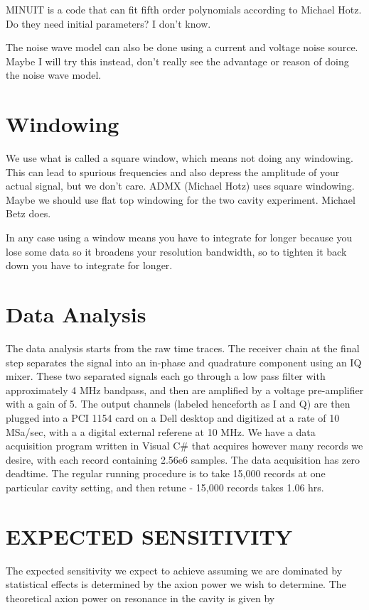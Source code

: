 \documentclass[11pt]{article}
\begin{document}
MINUIT is a code that can fit fifth order polynomials according to Michael Hotz. Do they need initial parameters? I don't know.

The noise wave model can also be done using a current and voltage noise source. Maybe I will try this instead, don't really see the advantage or reason of doing the noise wave model.


\section{Windowing}

We use what is called a square window, which means not doing any windowing. This can lead to spurious frequencies and also depress the amplitude of your actual signal, but we don't care.
ADMX (Michael Hotz) uses square windowing.
Maybe we should use flat top windowing for the two cavity experiment. Michael Betz does.

In any case using a window means you have to integrate for longer because you lose some data so it broadens your resolution bandwidth, so to tighten it back down you have to integrate for longer.

\section{Data Analysis}

The data analysis starts from the raw time traces. The receiver chain at the final step separates the signal into an in-phase and quadrature component using an IQ mixer. These two separated signals each go through a low pass filter with approximately 4 MHz bandpass, and then are amplified by a voltage pre-amplifier with a gain of 5. The output channels (labeled henceforth as I and Q) are then plugged into a PCI 1154 card on a Dell desktop and digitized at a rate of 10 MSa/sec, with a a digital external referene at 10 MHz. We have a data acquisition program written in Visual C$\#$ that acquires however many records we desire, with each record containing 2.56e6 samples. The data acquisition has zero deadtime. The regular running procedure is to take 15,000 records at one particular cavity setting, and then retune - 15,000 records takes 1.06 hrs. 

\section{EXPECTED SENSITIVITY}

The expected sensitivity we expect to achieve assuming we are dominated by statistical effects is determined by the axion power we wish to determine. The theoretical axion power on resonance in the cavity is given by 
\end{document}
